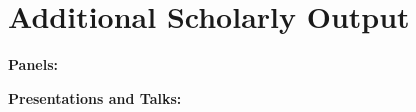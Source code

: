 \documentclass[wideaddress]{vitae}
\begin{document}
\section{Additional Scholarly Output}



\begin{refsection}

  \textbf{Panels:}
  \nocite{Andrade:2018aa,Yang:2017aa,Bruzelius:2016hb,Kopper:2016cl,North:2015db,Waid:2023aa}
  \printbibliography[heading=none]
\end{refsection}

\begin{refsection}
  \textbf{Presentations and Talks:}
  \nocite{Kopper:2020ab,Kopper:2020ac,Kopper:2019ag,Kopper:2019ae,Kopper:2019ad,Kopper:2019ac,Kopper:2019ab,Kopper:2019aa,Kopper:2018aa,Kopper:2016ng,Kopper:2015fi,Kopper:2015wj,Kopper:2014ys,Kopper:2014jo,Kopper:2014zv,Kopper:2013yi,Kopper:2013yk,Kopper:2012yw,Kopper:2012fd,Kopper:2011vp,Kopper:2011tn,Kopper:2008mw,Kopper:2023aa}
  \printbibliography[heading=none]
\end{refsection}
\end{document}
